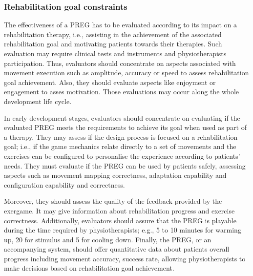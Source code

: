 \subsubsection{Rehabilitation goal constraints}
\label{sec:reh_goal_constraints}
The effectiveness of a \ac{PREG} has to be evaluated according to its impact on a rehabilitation therapy, i.e., assisting in the achievement of the associated rehabilitation goal and motivating patients towards their therapies. Such evaluation may require clinical tests and instruments and physiotherapists participation. Thus, evaluators should concentrate on aspects associated with movement execution such as amplitude, accuracy or speed to assess rehabilitation goal achievement. Also, they should evaluate aspects like enjoyment or engagement to asses motivation. Those evaluations may occur along the whole development life cycle.

In early development stages, evaluators should concentrate on evaluating if the evaluated \ac{PREG} meets the requirements to achieve its goal when used as part of a therapy. They may assess if the design process is focused on a rehabilitation goal; i.e., if the game mechanics relate directly to a set of movements and the exercises can be configured to personalise the experience according to patients' needs. They must evaluate if the \ac{PREG} can be used by patients safely, assessing aspects such as movement mapping correctness, adaptation capability and configuration capability and correctness. 

Moreover, they should assess the quality of the feedback provided by the exergame. It may give information about rehabilitation progress and exercise correctness. Additionally, evaluators should assure that the \ac{PREG} is playable during the time required by physiotherapists; e.g., 5 to 10 minutes for warming up, 20 for stimulus and 5 for cooling down. Finally, the \ac{PREG}, or an accompanying system, should offer quantitative data about patients overall progress including movement accuracy, success rate, allowing physiotherapists to make decisions based on rehabilitation goal achievement.

